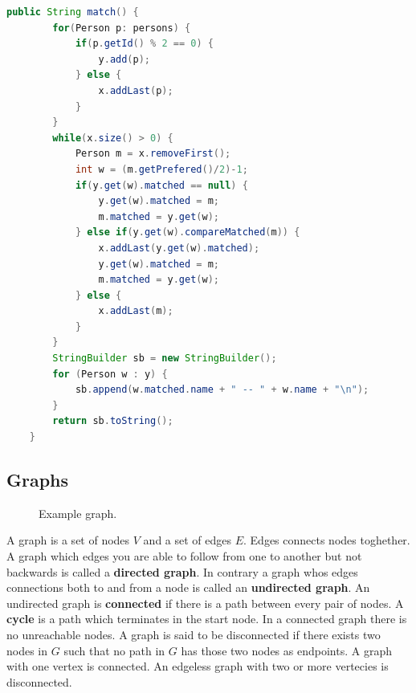\documentclass[12pt]{article} %
\begin{document}
\begin{lstlisting}[language=Java]
public String match() {
        for(Person p: persons) {
            if(p.getId() % 2 == 0) {
                y.add(p);
            } else {
                x.addLast(p);
            }
        }
        while(x.size() > 0) {
            Person m = x.removeFirst();
            int w = (m.getPrefered()/2)-1;
            if(y.get(w).matched == null) {
                y.get(w).matched = m;
                m.matched = y.get(w);
            } else if(y.get(w).compareMatched(m)) {
                x.addLast(y.get(w).matched);
                y.get(w).matched = m;
                m.matched = y.get(w);
            } else {
                x.addLast(m);
            }
        }
        StringBuilder sb = new StringBuilder();
        for (Person w : y) {
            sb.append(w.matched.name + " -- " + w.name + "\n");
        }
        return sb.toString();
    }
\end{lstlisting}

\subsection{Graphs} %
\begin{figure}[H]
\caption{Example graph.}
\label{exGraph}
\end{figure}
A graph is a set of nodes $V$ and a set of edges $E$. Edges connects nodes toghether. A graph which edges you are able to follow from one to another but not backwards is called a \textbf{directed graph}. In contrary a graph whos edges connections both to and from a node is called an \textbf{undirected graph}. An undirected graph is \textbf{connected} if there is a path between every pair of nodes. A \textbf{cycle} is a path which terminates in the start node. In a connected graph there is no unreachable nodes. A graph is said to be disconnected if there exists two nodes in $G$ such that no path in $G$ has those two nodes as endpoints. A graph with one vertex is connected. An edgeless graph with two or more vertecies is disconnected.
\end{document}
